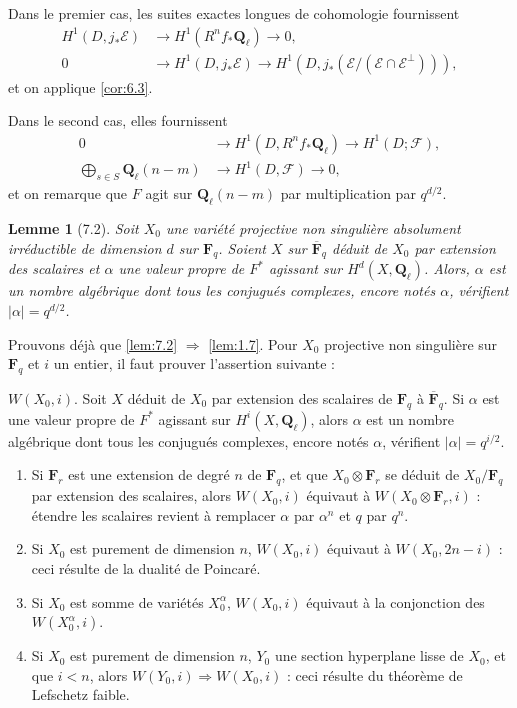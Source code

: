 \documentclass[12pt,a4paper]{amsart}
\theoremstyle{plain}
\newtheorem{lemme}[theoreme]{Lemme}
\theoremstyle{definition}
\theoremstyle{remark}
\newcommand{\Q}{\mathbf{Q}}
\newcommand{\F}{\mathbf{F}}
\numberwithin{equation}{section}
\begin{document}
Dans le premier cas, les suites exactes longues de cohomologie fournissent
\begin{align}
H^1(D, j_\ast\mathscr{E}) &\longrightarrow H^1(R^n f_\ast\Q_\ell) \longrightarrow 0, \tag{7.1.2$'$} \\
0 &\longrightarrow H^1(D, j_\ast\mathscr{E}) \longrightarrow H^1(D, j_\ast(\mathscr{E}/(\mathscr{E}\cap\mathscr{E}^\perp))), \tag{7.1.3$'$}
\end{align}
et on applique \eqref{cor:6.3}.

Dans le second cas, elles fournissent
\begin{align}
0 &\longrightarrow H^1(D, R^n f_\ast\Q_\ell) \longrightarrow H^1(D; \mathscr{F}), \tag{7.1.4$'$} \\
\bigoplus_{s\in S} \Q_\ell(n-m) &\longrightarrow H^1(D, \mathscr{F}) \longrightarrow 0, \tag{7.1.5$'$}
\end{align}
et on remarque que $F$ agit sur $\Q_\ell(n-m)$ par multiplication par $q^{d/2}$.

\begin{lemme}[7.2]\label{lem:7.2}
Soit $X_0$ une vari\'et\'e projective non singuli\`ere absolument irr\'eductible de dimension $d$ sur $\F_q$. Soient $X$ sur $\overline{\F}_q$ d\'eduit de $X_0$ par extension des scalaires et $\alpha$ une valeur propre de $F^*$ agissant sur $H^d(X,\Q_\ell)$. Alors, $\alpha$ est un nombre alg\'ebrique dont tous les conjugu\'es complexes, encore not\'es $\alpha$, v\'erifient $|\alpha|=q^{d/2}$.
\end{lemme}

Prouvons d\'ej\`a que \eqref{lem:7.2} $\Rightarrow$ \eqref{lem:1.7}. Pour $X_0$ projective non singuli\`ere sur $\F_q$ et $i$ un entier, il faut prouver l'assertion suivante :

$W(X_0, i)$. Soit $X$ d\'eduit de $X_0$ par extension des scalaires de $\F_q$ \`a $\overline{\F}_q$. Si $\alpha$ est une valeur propre de $F^*$ agissant sur $H^i(X,\Q_\ell)$, alors $\alpha$ est un nombre alg\'ebrique dont tous les conjugu\'es complexes, encore not\'es $\alpha$, v\'erifient $|\alpha|=q^{i/2}$.
\begin{enumerate}
\item[a)] Si $\F_r$ est une extension de degr\'e $n$ de $\F_q$, et que $X_0\otimes\F_r$ se d\'eduit de $X_0/\F_q$ par extension des scalaires, alors $W(X_0,i)$ \'equivaut \`a $W(X_0\otimes\F_r,i)$ : \'etendre les scalaires revient \`a remplacer $\alpha$ par $\alpha^n$ et $q$ par $q^n$.
\item[b)] Si $X_0$ est purement de dimension $n$, $W(X_0,i)$ \'equivaut \`a $W(X_0,2n-i)$ : ceci r\'esulte de la dualit\'e de Poincar\'e.
\item[c)] Si $X_0$ est somme de vari\'et\'es $X_0^\alpha$, $W(X_0,i)$ \'equivaut \`a la conjonction des $W(X_0^\alpha,i)$.
\item[d)] Si $X_0$ est purement de dimension $n$, $Y_0$ une section hyperplane lisse de $X_0$, et que $i<n$, alors $W(Y_0,i)\Rightarrow W(X_0,i)$ : ceci r\'esulte du th\'eor\`eme de Lefschetz faible.
\end{enumerate}
\end{document}
